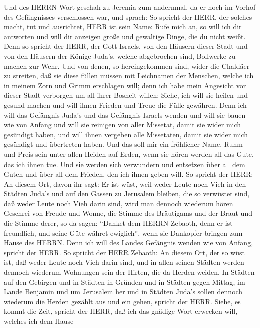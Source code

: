  Und des HERRN Wort geschah zu Jeremia zum andernmal, da er
noch im Vorhof des Gefängnisses verschlossen war, und sprach:
 So spricht der HERR, der solches macht, tut und ausrichtet,
HERR ist sein Name:  Rufe mich an, so will ich dir antworten
und will dir anzeigen große und gewaltige Dinge, die du nicht weißt.
 Denn so spricht der HERR, der Gott Israels, von den Häusern
dieser Stadt und von den Häusern der Könige Juda's, welche abgebrochen
sind, Bollwerke zu machen zur Wehr.  Und von denen, so
hereingekommen sind, wider die Chaldäer zu streiten, daß sie diese
füllen müssen mit Leichnamen der Menschen, welche ich in meinem Zorn und
Grimm erschlagen will; denn ich habe mein Angesicht vor dieser Stadt
verborgen um all ihrer Bosheit willen:  Siehe, ich will sie
heilen und gesund machen und will ihnen Frieden und Treue die Fülle
gewähren.  Denn ich will das Gefängnis Juda's und das
Gefängnis Israels wenden und will sie bauen wie von Anfang 
und will sie reinigen von aller Missetat, damit sie wider mich gesündigt
haben, und will ihnen vergeben alle Missetaten, damit sie wider mich
gesündigt und übertreten haben.  Und das soll mir ein
fröhlicher Name, Ruhm und Preis sein unter allen Heiden auf Erden, wenn
sie hören werden all das Gute, das ich ihnen tue. Und sie werden sich
verwundern und entsetzen über all dem Guten und über all dem Frieden,
den ich ihnen geben will.  So spricht der HERR: An diesem
Ort, davon ihr sagt: Er ist wüst, weil weder Leute noch Vieh in den
Städten Juda's und auf den Gassen zu Jerusalem bleiben, die so verwüstet
sind, daß weder Leute noch Vieh darin sind,  wird man
dennoch wiederum hören Geschrei von Freude und Wonne, die Stimme des
Bräutigams und der Braut und die Stimme derer, so da sagen: ``Danket dem
HERRN Zebaoth, denn er ist freundlich, und seine Güte währet ewiglich'',
wenn sie Dankopfer bringen zum Hause des HERRN. Denn ich will des Landes
Gefängnis wenden wie von Anfang, spricht der HERR.  So
spricht der HERR Zebaoth: An diesem Ort, der so wüst ist, daß weder
Leute noch Vieh darin sind, und in allen seinen Städten werden dennoch
wiederum Wohnungen sein der Hirten, die da Herden weiden. 
In Städten auf den Gebirgen und in Städten in Gründen und in Städten
gegen Mittag, im Lande Benjamin und um Jerusalem her und in Städten
Juda's sollen dennoch wiederum die Herden gezählt aus und ein gehen,
spricht der HERR.  Siehe, es kommt die Zeit, spricht der
HERR, daß ich das gnädige Wort erwecken will, welches ich dem Hause
